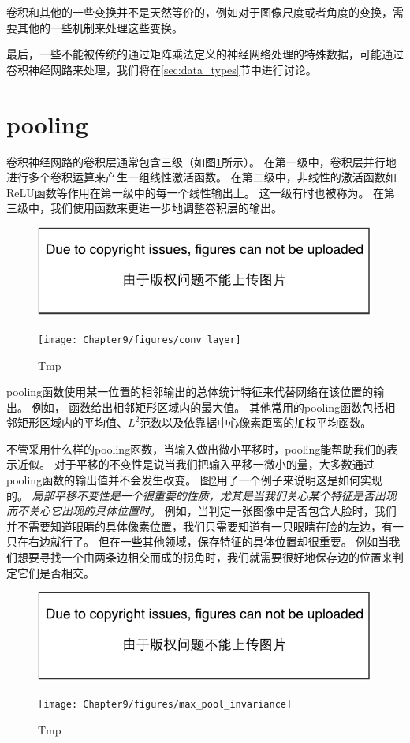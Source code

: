 卷积和其他的一些变换并不是天然等价的，例如对于图像尺度或者角度的变换，需要其他的一些机制来处理这些变换。

最后，一些不能被传统的通过矩阵乘法定义的神经网络处理的特殊数据，可能通过卷积神经网路来处理，我们将在\ref{sec:data_types}节中进行讨论。

\section{\gls{pooling}}
\label{sec:pooling}

卷积神经网路的卷积层通常包含三级（如图\ref{fig:chap9_conv_layer}所示）。
在第一级中，卷积层并行地进行多个卷积运算来产生一组线性激活函数。
在第二级中，非线性的激活函数如\gls{ReLU}函数等作用在第一级中的每一个线性输出上。
这一级有时也被称为。
在第三级中，我们使用函数来更进一步地调整卷积层的输出。
\begin{figure}[!htb]
\ifOpenSource
\centerline{\includegraphics{figure.pdf}}
\else
\centerline{\texttt{[image: Chapter9/figures/conv\_layer]}}
\fi
\caption{Tmp}
\label{fig:chap9_conv_layer}
\end{figure}

\gls{pooling}函数使用某一位置的相邻输出的总体统计特征来代替网络在该位置的输出。
例如， 函数\citep{zhou1988computation}给出相邻矩形区域内的最大值。
其他常用的\gls{pooling}函数包括相邻矩形区域内的平均值、$L^2$范数以及依靠据中心像素距离的加权平均函数。

 
不管采用什么样的\gls{pooling}函数，当输入做出微小平移时，\gls{pooling}能帮助我们的表示近似。
对于平移的不变性是说当我们把输入平移一微小的量，大多数通过\gls{pooling}函数的输出值并不会发生改变。
图\ref{fig:chap9_max_pool_invariance}用了一个例子来说明这是如何实现的。
\emph{局部平移不变性是一个很重要的性质，尤其是当我们关心某个特征是否出现而不关心它出现的具体位置时}。
例如，当判定一张图像中是否包含人脸时，我们并不需要知道眼睛的具体像素位置，我们只需要知道有一只眼睛在脸的左边，有一只在右边就行了。
但在一些其他领域，保存特征的具体位置却很重要。
例如当我们想要寻找一个由两条边相交而成的拐角时，我们就需要很好地保存边的位置来判定它们是否相交。
\begin{figure}[!htb]
\ifOpenSource
\centerline{\includegraphics{figure.pdf}}
\else
\centerline{\texttt{[image: Chapter9/figures/max\_pool\_invariance]}}
\fi
\caption{Tmp}
\label{fig:chap9_max_pool_invariance}
\end{figure}

